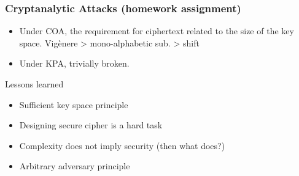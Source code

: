 \begin{frame}\frametitle{Cryptanalytic Attacks (homework assignment)}
\begin{itemize}
\item Under COA, the requirement for ciphertext related to the size of the key space.  Vig\`{e}nere > mono-alphabetic sub. > shift
\item Under KPA, trivially broken.
\end{itemize}
\begin{alertblock}{Lessons learned}
\begin{itemize}
\item Sufficient key space principle
\item Designing secure cipher is a hard task
\item Complexity does not imply security (then what does?)
\item Arbitrary adversary principle
\end{itemize}
\end{alertblock}
\end{frame}
